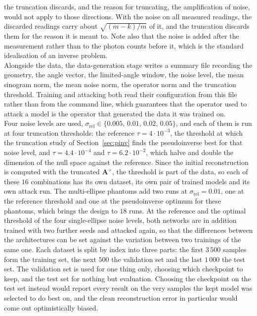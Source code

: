 \documentclass{article}
\numberwithin{equation}{section}
\begin{document}
the truncation discards, and the reason for truncating, the amplification of noise, would not apply to
those directions. With the noise on all measured readings, the discarded readings carry about
$\sqrt{(m-k)/m}$ of it, and the truncation discards them for the reason it is meant to. Note also that the
noise is added after the measurement rather than to the photon counts before it, which is the standard
idealisation of an inverse problem.\\
Alongside the data, the data-generation stage writes a summary file recording the geometry,
the angle vector, the limited-angle window, the noise level, the mean sinogram
norm, the mean noise norm, the operator norm and the truncation threshold.
Training and attacking both read their configuration from this file rather than
from the command line, which guarantees that the operator used to attack a model
is the operator that generated the data it was trained on.\\
Four noise levels are used, $\sigma_\text{rel}\in\{0.005,\,0.01,\,0.02,\,0.05\}$, and each of them is run at
four truncation thresholds: the reference $\tau=4\cdot10^{-3}$, the threshold at which the truncation study
of Section~\ref{sec:pinv} finds the pseudoinverse best for that noise level, and $\tau=4.4\cdot10^{-4}$ and
$\tau=6.2\cdot10^{-2}$, which halve and double the dimension of the null space against the reference.
Since the initial reconstruction is computed with the truncated $\mathbf{A}^{+}$, the threshold is part of
the data, so each of these $16$ combinations has its own dataset, its own pair of trained models and its
own attack run. The multi-ellipse phantoms add two runs at $\sigma_\text{rel}=0.01$, one at the reference
threshold and one at the pseudoinverse optimum for these phantoms, which brings the design to $18$ runs.
At the reference and the optimal threshold of the four single-ellipse noise
levels, both networks are in addition trained with two further seeds and attacked again, so that the
differences between the architectures can be set against the variation between two trainings of the same
one. Each dataset is split
by index into three parts: the first $3\,500$ samples form the training set,
the next $500$ the validation set and the last $1\,000$ the test set.
The validation set is used for one thing only, choosing
which checkpoint to keep, and the test set for nothing but evaluation. Choosing
the checkpoint on the test set instead would report every result on the very
samples the kept model was selected to do best on, and the clean reconstruction
error in particular would come out optimistically biased.
\end{document}
